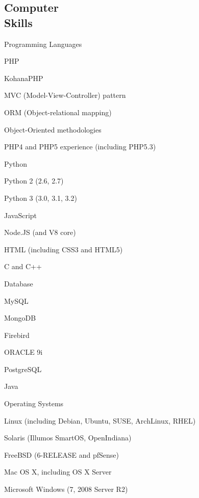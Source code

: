 \documentclass[margin,line]{resume}
\begin{document}
\begin{resume}
	\section{\mysidestyle Computer\\Skills}
	Programming Languages
	\begin{list2}
		\vspace*{1mm}
		\item PHP
		\begin{list2}
			\vspace*{1mm}
			\item KohanaPHP
			\item MVC (Model-View-Controller) pattern
			\item ORM (Object-relational mapping)
			\item Object-Oriented methodologies
			\item PHP4 and PHP5 experience (including PHP5.3)
		\end{list2}
		\item Python
		\begin{list2}
			\item Python 2 (2.6, 2.7)
			\item Python 3 (3.0, 3.1, 3.2)
		\end{list2}
		\item JavaScript
		\item Node.JS (and V8 core)
		\item HTML (including CSS3 and HTML5)
		\item C and C++
		
		\item Database
		\begin{list2}
			\item MySQL
			\item MongoDB
			\item Firebird
			\item ORACLE 9i 
			\item PostgreSQL
		\end{list2}
		\item Java
	\end{list2}

	Operating Systems
	\begin{list2}
		\vspace*{1mm}
		\item Linux (including Debian, Ubuntu, SUSE, ArchLinux, RHEL)
		\item Solaris (Illumos SmartOS, OpenIndiana)
		\item FreeBSD (6-RELEASE and pfSense)
		\item Mac OS X, including OS X Server
		\item Microsoft Windows (7, 2008 Server R2)
	\end{list2}


\end{resume}
\end{document}
